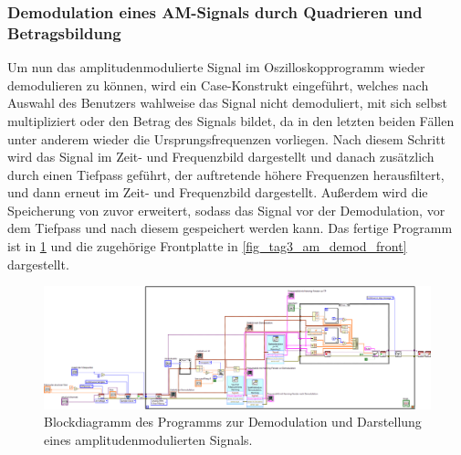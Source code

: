 \documentclass[
a4paper,
12pt,
pagesize,
ngerman
]{scrartcl}
\begin{document}
	\subsubsection{Demodulation eines AM-Signals durch Quadrieren und Betragsbildung} \label{DemodulationAM}
	Um nun das amplitudenmodulierte Signal im Oszilloskopprogramm wieder demodulieren zu können, wird ein Case-Konstrukt eingeführt, welches nach Auswahl des Benutzers wahlweise das Signal nicht demoduliert, mit sich selbst multipliziert oder den Betrag des Signals bildet, da in den letzten beiden Fällen unter anderem wieder die Ursprungsfrequenzen vorliegen.
	Nach diesem Schritt wird das Signal im Zeit- und Frequenzbild dargestellt und danach zusätzlich durch einen Tiefpass geführt, der auftretende höhere Frequenzen herausfiltert, und dann erneut im Zeit- und Frequenzbild dargestellt.
	Außerdem wird die Speicherung von zuvor erweitert, sodass das Signal vor der Demodulation, vor dem Tiefpass und nach diesem gespeichert werden kann.
	Das fertige Programm ist in \cref{fig_tag3_am_demod_block} und die zugehörige Frontplatte in \cref{fig_tag3_am_demod_front} dargestellt.

	\begin{figure}[H]  
		\includegraphics[width=1\textwidth]{EIRE2018Dateien/Tag3/modifizierterOszi/Oszilloskop__modifiziertd}
		\centering
		\caption{
			Blockdiagramm des Programms zur Demodulation und Darstellung eines amplitudenmodulierten Signals.
		}
		\label{fig_tag3_am_demod_block}
		\centering
	\end{figure}
\end{document}
